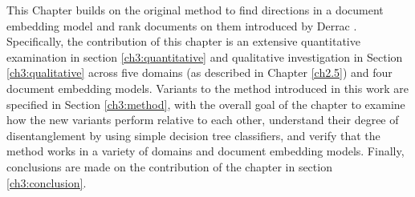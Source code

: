 This Chapter builds on the original method to find directions in a document embedding model and rank documents on them introduced by Derrac \cite {Derrac2015}. Specifically, the contribution of this chapter  is an extensive quantitative examination in section \ref{ch3:quantitative} and qualitative investigation in Section \ref{ch3:qualitative} across five domains (as described in Chapter \ref{ch2.5}) and four document embedding models. Variants to  the method introduced in this work are specified in Section \ref{ch3:method}, with the overall goal of the chapter to examine how the new variants perform relative to each other, understand their degree of disentanglement by using simple decision tree classifiers, and verify that the method works in a variety of domains and document embedding models.  Finally, conclusions are made on the contribution of the chapter in section \ref{ch3:conclusion}. %
 






